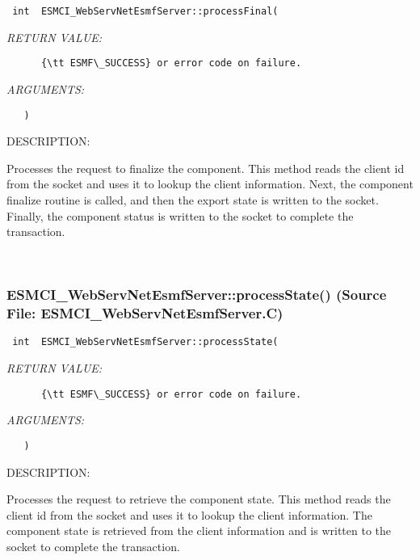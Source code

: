   
\begin{verbatim} int  ESMCI_WebServNetEsmfServer::processFinal(\end{verbatim}{\em RETURN VALUE:}
\begin{verbatim}      {\tt ESMF\_SUCCESS} or error code on failure.\end{verbatim}{\em ARGUMENTS:}
\begin{verbatim}   )\end{verbatim}
{\sf DESCRIPTION:\\ }


      Processes the request to finalize the component.  This method reads the
      client id from the socket and uses it to lookup the client information.
      Next, the component finalize routine is called, and then the export
      state is written to the socket.  Finally, the component status is
      written to the socket to complete the transaction.
   
 
\mbox{}\hrulefill\
 
\subsubsection{ESMCI\_WebServNetEsmfServer::processState() (Source File: ESMCI\_WebServNetEsmfServer.C)}


  
\begin{verbatim} int  ESMCI_WebServNetEsmfServer::processState(\end{verbatim}{\em RETURN VALUE:}
\begin{verbatim}      {\tt ESMF\_SUCCESS} or error code on failure.\end{verbatim}{\em ARGUMENTS:}
\begin{verbatim}   )\end{verbatim}
{\sf DESCRIPTION:\\ }


      Processes the request to retrieve the component state.  This method
      reads the client id from the socket and uses it to lookup the client
      information. The component state is retrieved from the client
      information and is written to the socket to complete the transaction.
   
 
\mbox{}\hrulefill\
 
